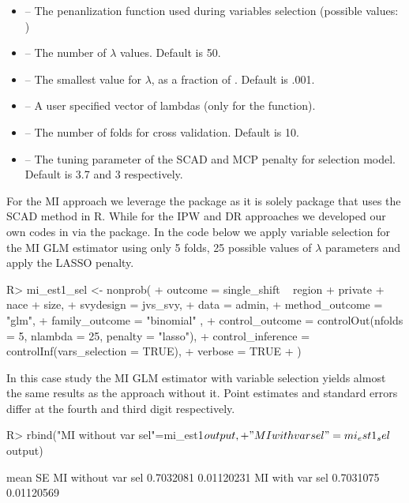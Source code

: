 \documentclass[
]{jss}
\begin{document}
\begin{itemize}
\item {} -- The penanlization function used during variables selection (possible values: )
\item {} -- The number of $\lambda$ values. Default is 50.
\item {} -- The smallest value for $\lambda$, as a fraction of . Default is .001.
\item {} -- A user specified vector of lambdas (only for the  function).
\item {} -- The number of folds for cross validation. Default is 10.
\item {} -- The tuning parameter of the SCAD and MCP penalty for selection model. Default is 3.7 and 3 respectively.
\end{itemize}

For the MI approach we leverage the  package \citep{ncvreg}
as it is solely package that uses the SCAD method in R. While for the
IPW and DR approaches we developed our own codes in  via
the  package. In the code below we apply variable selection
for the MI GLM estimator using only 5 folds, 25 possible values of
\(\lambda\) parameters and apply the LASSO penalty.

\begin{CodeChunk}
\begin{CodeInput}
R> mi_est1_sel <- nonprob(
+   outcome = single_shift ~ region + private + nace + size,
+   svydesign = jvs_svy,
+   data = admin,
+   method_outcome = "glm",
+   family_outcome = "binomial" ,
+   control_outcome = controlOut(nfolds = 5, nlambda = 25, penalty = "lasso"),
+   control_inference = controlInf(vars_selection = TRUE),
+   verbose = TRUE
+ )
\end{CodeInput}
\end{CodeChunk}

In this case study the MI GLM estimator with variable selection yields
almost the same results as the approach without it. Point estimates and
standard errors differ at the fourth and third digit respectively.

\begin{CodeChunk}
\begin{CodeInput}
R> rbind("MI without var sel"=mi_est1$output,
+       "MI with var sel"=mi_est1_sel$output)
\end{CodeInput}
\begin{CodeOutput}
                        mean         SE
MI without var sel 0.7032081 0.01120231
MI with var sel    0.7031075 0.01120569
\end{CodeOutput}
\end{CodeChunk}
\end{document}

